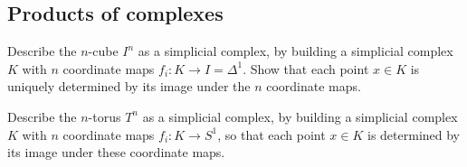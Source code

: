 \documentclass[12pt]{pset}
\begin{document}
\subsection*{Products of complexes}

\begin{problem}
  Describe the $n$-cube $I^n$ as a simplicial complex, by building a
  simplicial complex $K$ with $n$ coordinate maps $f_i : K \to I =
  \Delta^1$.  Show that each point $x \in K$ is uniquely determined by
  its image under the $n$ coordinate maps.
\end{problem}

\begin{problem}
  Describe the $n$-torus $T^n$ as a simplicial complex, by building a
  simplicial complex $K$ with $n$ coordinate maps $f_i : K \to S^1$,
  so that each point $x \in K$ is determined by its image under these
  coordinate maps.
\end{problem}
\end{document}
